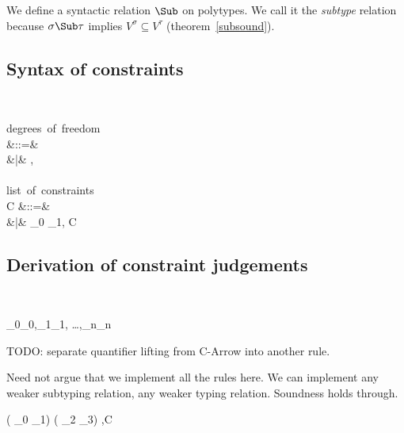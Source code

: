 \documentclass{amsart}
\theoremstyle{definition}
\begin{document}
We define a syntactic relation $\Sub$ on polytypes. We call it
the \emph{subtype} relation because $\sigma \Sub \tau$ implies
$V^\sigma \subseteq V^\tau$ (theorem~\ref{subsound}).

\subsection{Syntax of constraints}~

\begin{syntax}
\mbox{degrees of freedom}\\
\Delta
&::=& \emptyset \\
&|& \alpha,\Delta
\\
\\
\mbox{list of constraints}\\
C
&::=& \emptyset \\
&|& \rho_0 \Sub \rho_1, C
\end{syntax}

\subsection{Derivation of constraint judgements}~

\infrule[C-Refl]
{}
{\Delta \vdash \rho_0\Sub\rho_0,\rho_1\Sub\rho_1,
\ldots,\rho_n\Sub\rho_n}

TODO: separate quantifier lifting from {\sc C-Arrow} into another rule.

Need not argue that we implement all the rules here.
We can implement any weaker subtyping relation, any weaker typing
relation. Soundness holds through.

{\Delta\vdash
(\All{\bar\alpha} \Ex{\bar\beta} \theta_0 \R \theta_1)
\Sub
(\All{\bar\gamma} \Ex{\bar\delta} \theta_2 \R \theta_3)
,C}
\end{document}
